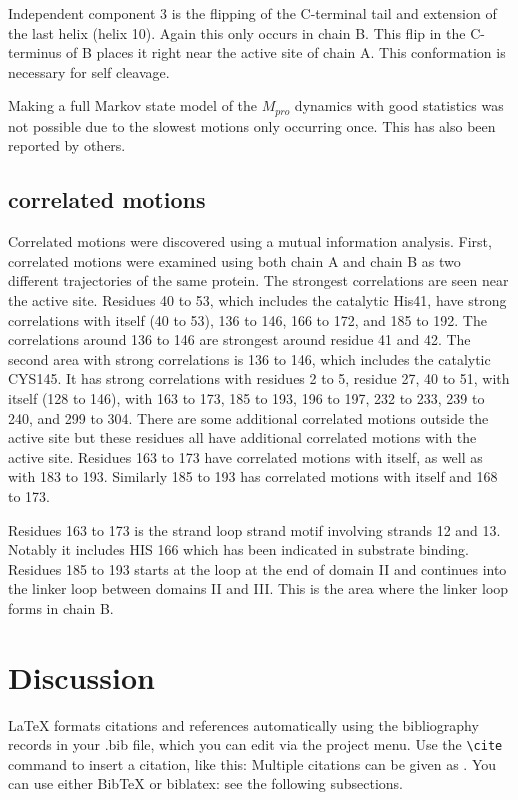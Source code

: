 \documentclass{biophys-new}
\begin{document}
Independent component 3 is the flipping of the C-terminal tail and extension of the last helix (helix 10). Again this only occurs in chain B. This flip in the C-terminus of B places it right near the active site of chain A. This conformation is necessary for self cleavage.

Making a full Markov state model of the $M_{pro}$ dynamics with good statistics was not possible due to the slowest motions only occurring once. This has also been reported by others. \cite{carli2020candidate, cocina2020sapphire}

\subsection*{correlated motions}

Correlated motions were discovered using a mutual information analysis. First, correlated motions were examined using both chain A and chain B as two different trajectories of the same protein. The strongest correlations are seen near the active site. Residues 40 to 53, which includes the catalytic His41, have strong correlations with itself (40 to 53), 136 to 146, 166 to 172, and 185 to 192. The correlations around 136 to 146 are strongest around residue 41 and 42. The second area with strong correlations is 136 to 146, which includes the catalytic CYS145. It has strong correlations with residues 2 to 5, residue 27, 40 to 51, with itself (128 to 146), with 163 to 173, 185 to 193, 196 to 197, 232 to 233, 239 to 240, and 299 to 304. There are some additional correlated motions outside the active site but these residues all have additional correlated motions with the active site. Residues 163 to 173 have correlated motions with itself, as well as with 183 to 193. Similarly 185 to 193 has correlated motions with itself and 168 to 173.

Residues 163 to 173 is the strand loop strand motif involving strands 12 and 13. Notably it includes HIS 166 which has been indicated in substrate binding. Residues 185 to 193 starts at the loop at the end of domain II and continues into the linker loop between domains II and III. 
This is the area where the linker loop forms in chain B. 
\section*{Discussion}

\LaTeX{} formats citations and references automatically using the bibliography records in your .bib file, which you can edit via the project menu. Use the \verb|\cite| command to insert a citation, like this: \cite{Chen_Nicholson00} Multiple citations can be given as \cite{Stiles_Bartol01,el-Kareh_etal93,Callaghan91}. You can use either BibTeX or biblatex: see the following subsections.
\end{document}
